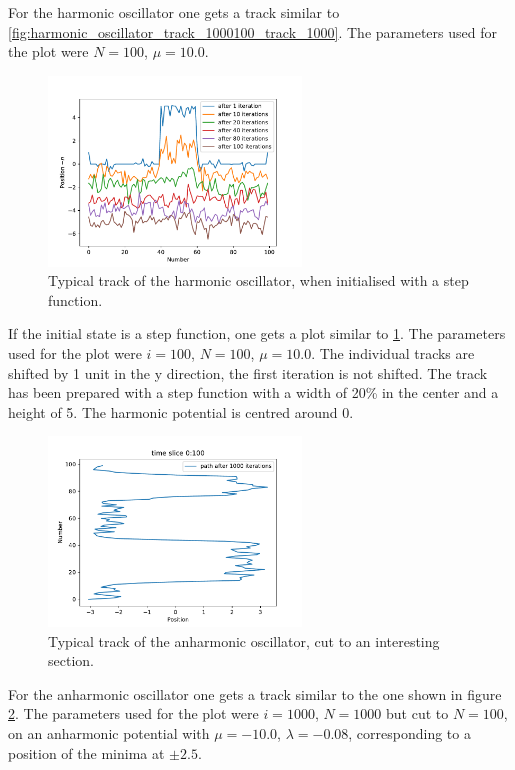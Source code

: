\documentclass{scrartcl}
\begin{document}
		For the harmonic oscillator one gets a track similar to \ref{fig:harmonic_oscillator_track_1000100_track_1000}.
		The parameters used for the plot were $N=100$, $\mu = 10.0$.
		\begin{figure}[H]
			\centering
				\includegraphics[width=0.6\textwidth]{../imgs/harmonic_oscillator_track/track_100100_step_track_shifted_double.pdf}
			\caption{Typical track of the harmonic oscillator, when initialised with a step function.}
			\label{fig:harmonic_oscillator_track_100100_100100_step_track_shifted_double}
		\end{figure}
		If the initial state is a step function, one gets a plot similar to \ref{fig:harmonic_oscillator_track_100100_100100_step_track_shifted_double}.
		The parameters used for the plot were $i=100$, $N=100$, $\mu = 10.0$.
		The individual tracks are shifted by 1 unit in the y direction, the first iteration is not shifted.
		The track has been prepared with a step function with a width of 20\% in the center and a height of 5.
		The harmonic potential is centred around 0.
		\begin{figure}[H]
			\centering
				\includegraphics[width=0.6\textwidth]{../imgs/anharmonic_oscillator_track/track_100010005_track_pretty_1000.pdf}
			\caption{Typical track of the anharmonic oscillator, cut to an interesting section.}
			\label{fig:anharmonic_oscillator_track_100010005_track_pretty_1000}
		\end{figure}
		For the anharmonic oscillator one gets a track similar to the one shown in figure \ref{fig:anharmonic_oscillator_track_100010005_track_pretty_1000}.
		The parameters used for the plot were $i=1000$, $N=1000$ but cut to $N=100$, on an anharmonic potential with $\mu = -10.0$, $\lambda = -0.08$, corresponding to a position of the minima at $\pm 2.5$.
\end{document}

